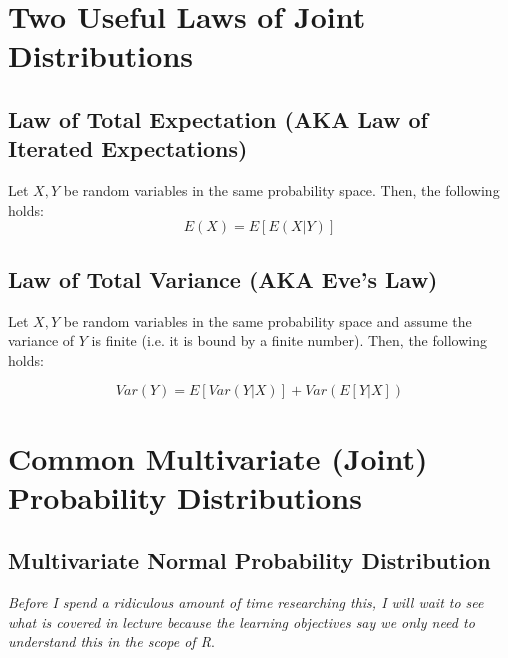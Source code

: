 \documentclass[12pt]{article}
\begin{document}
\section{Two Useful Laws of Joint Distributions}

\subsection{Law of Total Expectation (AKA Law of Iterated Expectations)}

Let $X, Y$ be random variables in the same probability space. Then, the following holds:
\[
	E(X) = E[E(X | Y)]
\]

\subsection{Law of Total Variance (AKA Eve's Law)}
Let $X, Y$ be random variables in the same probability space and assume the
variance of $Y$ is finite (i.e. it is bound by a finite number). Then, the
following holds:

\[
	Var(Y) = E[Var(Y | X)] + Var(E[Y | X])
\]

\section{Common Multivariate (Joint) Probability Distributions}

\subsection{Multivariate Normal Probability Distribution}

\emph{Before I spend a ridiculous amount of time researching this, I will wait
	to see what is covered in lecture because the learning objectives say we only
	need to understand this in the scope of R}.
\end{document}
